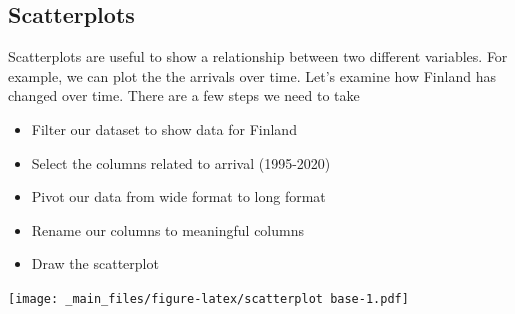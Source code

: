 \documentclass[
]{book}
\newenvironment{Shaded}{\begin{snugshade}}{\end{snugshade}}
\newcommand{\AttributeTok}[1]{\textcolor[rgb]{0.77,0.63,0.00}{#1}}
\newcommand{\DecValTok}[1]{\textcolor[rgb]{0.00,0.00,0.81}{#1}}
\newcommand{\FunctionTok}[1]{\textcolor[rgb]{0.00,0.00,0.00}{#1}}
\newcommand{\NormalTok}[1]{#1}
\newcommand{\OtherTok}[1]{\textcolor[rgb]{0.56,0.35,0.01}{#1}}
\newcommand{\SpecialCharTok}[1]{\textcolor[rgb]{0.00,0.00,0.00}{#1}}
\newcommand{\StringTok}[1]{\textcolor[rgb]{0.31,0.60,0.02}{#1}}
\begin{document}
\hypertarget{scatterplots}{%
\subsection{Scatterplots}\label{scatterplots}}

Scatterplots are useful to show a relationship between two different variables. For example, we can plot the the arrivals over time. Let's examine how Finland has changed over time. There are a few steps we need to take

\begin{itemize}
\item
  Filter our dataset to show data for Finland
\item
  Select the columns related to arrival (1995-2020)
\item
  Pivot our data from wide format to long format
\item
  Rename our columns to meaningful columns
\item
  Draw the scatterplot
\end{itemize}

\begin{Shaded}
\end{Shaded}

\texttt{[image: \_main\_files/figure-latex/scatterplot base-1.pdf]}
\end{document}
